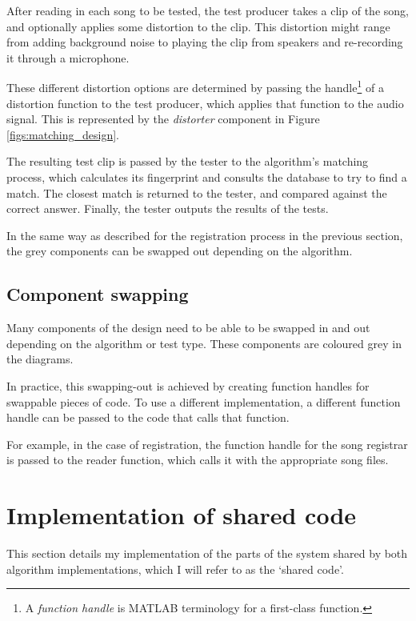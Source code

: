 \documentclass[12pt,a4paper,twoside,openright]{report}
\begin{document}
After reading in each song to be tested, the test producer takes a clip of the song, and optionally applies some distortion to the clip. This distortion might range from adding background noise to playing the clip from speakers and re-recording it through a microphone.

These different distortion options are determined by passing the handle\footnote{A \textit{function handle} is MATLAB terminology for a first-class function.} of a distortion function to the test producer, which applies that function to the audio signal. This is represented by the \textit{distorter} component in Figure \ref{figs:matching_design}.

The resulting test clip is passed by the tester to the algorithm's matching process, which calculates its fingerprint and consults the database to try to find a match. The closest match is returned to the tester, and compared against the correct answer. Finally, the tester outputs the results of the tests.

In the same way as described for the registration process in the previous section, the grey components can be swapped out depending on the algorithm.


\subsection{Component swapping}

Many components of the design need to be able to be swapped in and out depending on the algorithm or test type. These components are coloured grey in the diagrams.

In practice, this swapping-out is achieved by creating function handles for swappable pieces of code. To use a different implementation, a different function handle can be passed to the code that calls that function.

For example, in the case of registration, the function handle for the song registrar is passed to the reader function, which calls it with the appropriate song files.


\section{Implementation of shared code}
\label{section:sharedimpl}

This section details my implementation of the parts of the system shared by both algorithm implementations, which I will refer to as the `shared code'.
\end{document}
